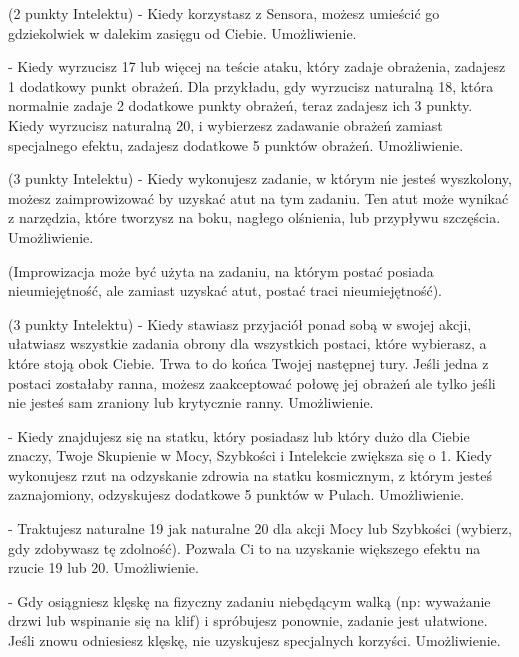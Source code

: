 { (2 punkty Intelektu) - Kiedy korzystasz z Sensora, możesz umieścić go gdziekolwiek w dalekim zasięgu od Ciebie. Umożliwienie.

 - Kiedy wyrzucisz 17 lub więcej na teście ataku, który zadaje obrażenia, zadajesz 1 dodatkowy punkt obrażeń. Dla przykładu, gdy wyrzucisz naturalną 18, która normalnie zadaje 2 dodatkowe punkty obrażeń, teraz zadajesz ich 3 punkty. Kiedy wyrzucisz naturalną 20, i wybierzesz zadawanie obrażeń zamiast specjalnego efektu, zadajesz dodatkowe 5 punktów obrażeń. Umożliwienie.

 (3 punkty Intelektu) - Kiedy wykonujesz zadanie, w którym nie jesteś wyszkolony, możesz zaimprowizować by uzyskać atut na tym zadaniu. Ten atut może wynikać z narzędzia, które tworzysz na boku, nagłego olśnienia, lub przypływu szczęścia. Umożliwienie. 

(Improwizacja może być użyta na zadaniu, na którym postać posiada nieumiejętność, ale zamiast uzyskać atut, postać traci nieumiejętność).

 (3 punkty Intelektu) - Kiedy stawiasz przyjaciół ponad sobą w swojej akcji, ułatwiasz wszystkie zadania obrony dla wszystkich postaci, które wybierasz, a które stoją obok Ciebie. Trwa to do końca Twojej następnej tury. Jeśli jedna z postaci zostałaby ranna, możesz zaakceptować połowę jej obrażeń ale tylko jeśli nie jesteś sam zraniony lub krytycznie ranny. Umożliwienie.

 - Kiedy znajdujesz się na statku, który posiadasz lub który dużo dla Ciebie znaczy, Twoje Skupienie w Mocy, Szybkości i Intelekcie zwiększa się o 1. Kiedy wykonujesz rzut na odzyskanie zdrowia na statku kosmicznym, z którym jesteś zaznajomiony, odzyskujesz dodatkowe 5 punktów w Pulach. Umożliwienie.

 - Traktujesz naturalne 19 jak naturalne 20 dla akcji Mocy lub Szybkości (wybierz, gdy zdobywasz tę zdolność). Pozwala Ci to na uzyskanie większego efektu na rzucie 19 lub 20. Umożliwienie. 

 - Gdy osiągniesz klęskę na fizyczny zadaniu niebędącym walką (np: wyważanie drzwi lub wspinanie się na klif) i spróbujesz ponownie, zadanie jest ułatwione. Jeśli znowu odniesiesz klęskę, nie uzyskujesz specjalnych korzyści. Umożliwienie. 

}
